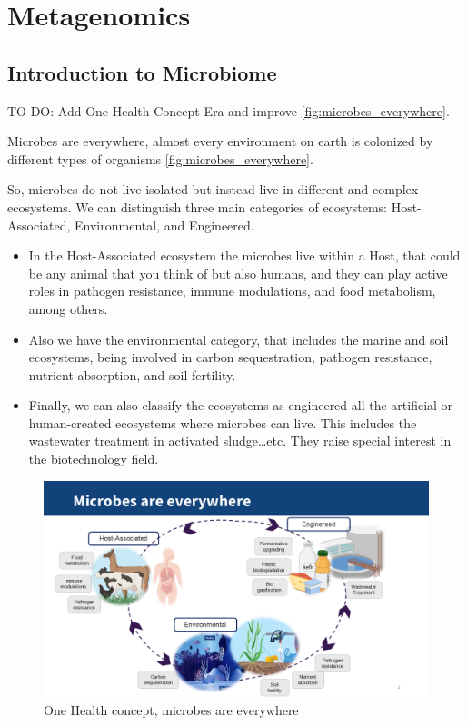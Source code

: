\chapter{Metagenomics}\label{chp:metagenomics}

\minitoc
\section{Introduction to Microbiome}
TO DO: Add One Health Concept Era and improve \autoref{fig:microbes_everywhere}.

Microbes are everywhere, almost every environment on earth is colonized by different types of organisms \autoref{fig:microbes_everywhere}. 

So, microbes do not live isolated but instead live in different and complex \gls{ecosystems}. We can distinguish three main 
categories of ecosystems: Host-Associated, Environmental, and Engineered.
\begin{itemize}
    \item In the Host-Associated ecosystem the microbes live within a Host, that could be any animal that you think of 
    but also humans, and they can play active roles in pathogen resistance, immune modulations, and food metabolism, among others.
    \item Also we have the environmental category, that includes the marine and soil ecosystems, being involved in carbon 
    sequestration, pathogen resistance, nutrient absorption, and soil fertility.
    \item Finally, we can also classify the ecosystems as engineered all the artificial or human-created ecosystems 
    where microbes can live. This includes the wastewater treatment in activated sludge…etc. They raise special interest 
    in the biotechnology field.
\end{itemize}
\begin{figure}[!ht]
    \centering
    \includegraphics[width=1\linewidth]{./figure/microbes_everywhere.png}
    \caption{One Health concept, microbes are everywhere}
    \label{fig:microbes_everywhere}
\end{figure}

